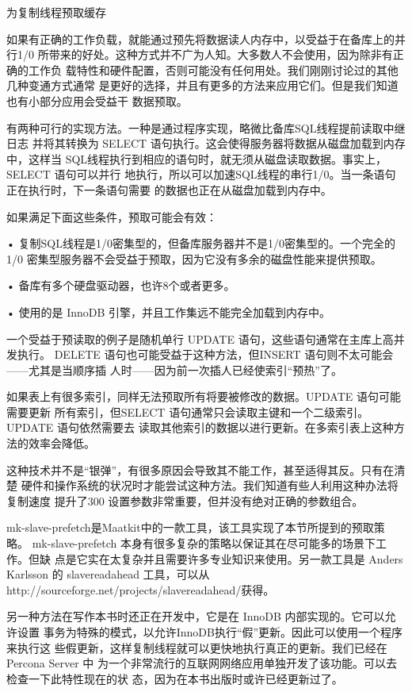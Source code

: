 为复制线程预取缓存

如果有正确的工作负载，就能通过预先将数据读人内存中，以受益于在备库上的并行1/0
所带来的好处。这种方式并不广为人知。大多数人不会使用，因为除非有正确的工作负
载特性和硬件配置，否则可能没有任何用处。我们刚刚讨论过的其他几种变通方式通常
是更好的选择，并且有更多的方法来应用它们。但是我们知道也有小部分应用会受益干
数据预取。

有两种可行的实现方法。一种是通过程序实现，略微比备库SQL线程提前读取中继日志
并将其转换为 SELECT 语句执行。这会使得服务器将数据从磁盘加载到内存中，这样当
SQL线程执行到相应的语句时，就无须从磁盘读取数据。事实上，SELECT 语句可以并行
地执行，所以可以加速SQL线程的串行1/0。当一条语句正在执行时，下一条语句需要
的数据也正在从磁盘加载到内存中。

如果满足下面这些条件，预取可能会有效：

• 复制SQL线程是1/0密集型的，但备库服务器并不是1/0密集型的。一个完全的1/0
密集型服务器不会受益于预取，因为它没有多余的磁盘性能来提供预取。

• 备库有多个硬盘驱动器，也许8个或者更多。

• 使用的是 InnoDB 引擎，并且工作集远不能完全加载到内存中。

一个受益于预读取的例子是随机单行 UPDATE 语句，这些语句通常在主库上高并发执行。
DELETE 语句也可能受益于这种方法，但INSERT 语句则不太可能会——尤其是当顺序插
人时——因为前一次插人已经使索引“预热”了。

如果表上有很多索引，同样无法预取所有将要被修改的数据。UPDATE 语句可能需要更新
所有索引，但SELECT 语句通常只会读取主键和一个二级索引。UPDATE 语句依然需要去
读取其他索引的数据以进行更新。在多索引表上这种方法的效率会降低。

这种技术并不是“银弹”，有很多原因会导致其不能工作，甚至适得其反。只有在清楚
硬件和操作系统的状况时才能尝试这种方法。我们知道有些人利用这种办法将复制速度
提升了300%
设置参数非常重要，但并没有绝对正确的参数组合。

mk-slave-prefetch是Maatkit中的一款工具，该工具实现了本节所提到的预取策略。
mk-slave-prefetch 本身有很多复杂的策略以保证其在尽可能多的场景下工作。但缺
点是它实在太复杂并且需要许多专业知识来使用。另一款工具是 Anders Karlsson 的
slavereadahead 工具，可以从 http://sourceforge.net/projects/slavereadahead/获得。

另一种方法在写作本书时还正在开发中，它是在 InnoDB 内部实现的。它可以允许设置
事务为特殊的模式，以允许InnoDB执行“假”更新。因此可以使用一个程序来执行这
些假更新，这样复制线程就可以更快地执行真正的更新。我们已经在 Percona Server 中
为一个非常流行的互联网网络应用单独开发了该功能。可以去检查一下此特性现在的状
态，因为在本书出版时或许已经更新过了。


